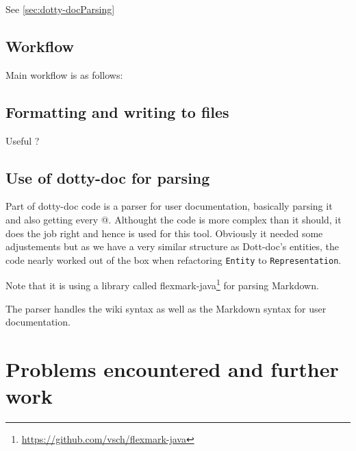 \documentclass{report}
\begin{document}
See \autoref{sec:dotty-docParsing}

\section{Workflow}
Main workflow is as follows:

\begin{center}
\end{center}

\section{Formatting and writing to files}

Useful ?

\section{Use of dotty-doc for parsing}
\label{sec:dotty-docParsing}

Part of dotty-doc code is a parser for user documentation, basically parsing it and also getting every @. Althought the code is more complex than it should, it does the job right and hence is used for this tool. Obviously it needed some adjustements but as we have a very similar structure as Dott-doc's entities, the code nearly worked out of the box when refactoring \texttt{Entity} to \texttt{Representation}.

Note that it is using a library called flexmark-java\footnote{\url{https://github.com/vsch/flexmark-java}} for parsing Markdown.

The parser handles the wiki syntax as well as the Markdown syntax for user documentation.

\chapter{Problems encountered and further work}
\end{document}
